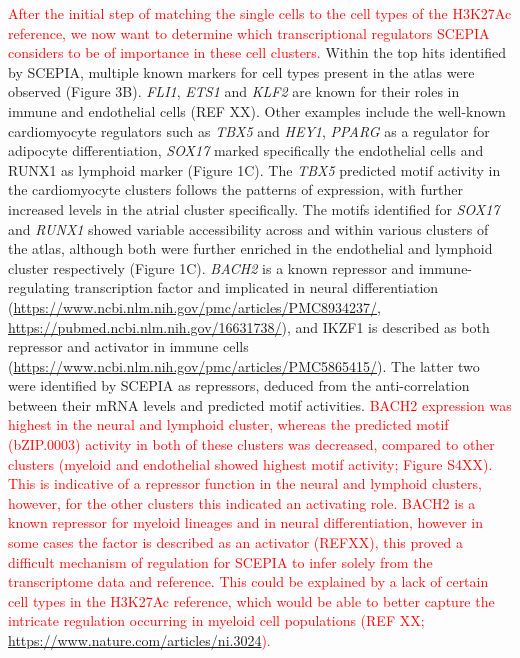 \textcolor{red}{After the initial step of matching the single cells to the cell types of the H3K27Ac reference, we now want to determine which transcriptional regulators SCEPIA considers to be of importance in these cell clusters.} Within the top hits identified by SCEPIA, multiple known markers for cell types present in the atlas were observed (Figure 3B). \textit{FLI1}, \textit{ETS1} and \textit{KLF2} are known for their roles in immune and endothelial cells (REF XX). Other examples include the well-known cardiomyocyte regulators such as \textit{TBX5} and \textit{HEY1}, \textit{PPARG }as a regulator for adipocyte differentiation, \textit{SOX17} marked specifically the endothelial cells and RUNX1 as lymphoid marker (Figure 1C). The \textit{TBX5} predicted motif activity in the cardiomyocyte clusters follows the patterns of expression, with further increased levels in the atrial cluster specifically. The motifs identified for \textit{SOX17} and \textit{RUNX1} showed variable accessibility across and within various clusters of the atlas, although both were further enriched in the endothelial and lymphoid cluster respectively (Figure 1C). \textit{BACH2} is a known repressor and immune-regulating transcription factor and implicated in neural differentiation (\href{https://www.ncbi.nlm.nih.gov/pmc/articles/PMC8934237/}{https://www.ncbi.nlm.nih.gov/pmc/articles/PMC8934237/}, \href{https://pubmed.ncbi.nlm.nih.gov/16631738/}{https://pubmed.ncbi.nlm.nih.gov/16631738/}), and IKZF1 is described as both repressor and activator in immune cells (\href{https://www.ncbi.nlm.nih.gov/pmc/articles/PMC5865415/}{https://www.ncbi.nlm.nih.gov/pmc/articles/PMC5865415/}). The latter two were identified by SCEPIA as repressors, deduced from the anti-correlation between their mRNA levels and predicted motif activities. \textcolor{red}{BACH2 expression was highest in the neural and lymphoid cluster, whereas the predicted motif (bZIP.0003) activity in both of these clusters was decreased, compared to other clusters (myeloid and endothelial showed highest motif activity; Figure S4XX). This is indicative of a repressor function in the neural and lymphoid clusters, however, for the other clusters this indicated an activating role. BACH2 is a known repressor for myeloid lineages and in neural differentiation, however in some cases the factor is described as an activator (REFXX), this proved a difficult mechanism of regulation for SCEPIA to infer solely from the transcriptome data and reference. This could be explained by a lack of certain cell types in the H3K27Ac reference, which would be able to better capture the intricate regulation occurring in myeloid cell populations (REF XX; \href{https://www.nature.com/articles/ni.3024}{https://www.nature.com/articles/ni.3024}).}
